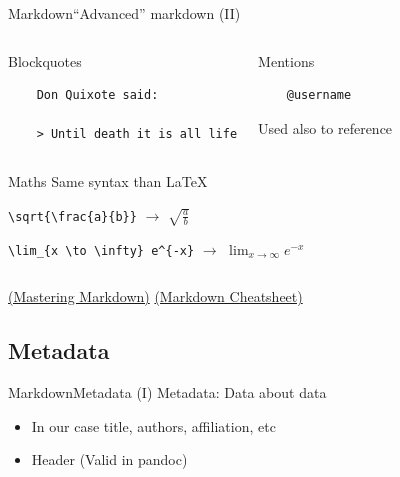 \documentclass{beamer}
\begin{document}
\begin{frame}[fragile]{Markdown}{``Advanced'' markdown (II)}
	\begin{columns}
	\begin{block}{Blockquotes}
	\begin{verbatim}
	Don Quixote said:

	> Until death it is all life
	\end{verbatim}
	\end{block}

	\begin{block}{Mentions}
	\begin{verbatim}
	@username
	\end{verbatim}
	Used also to reference
	\end{block}
	\end{columns}

	\begin{columns}
	\begin{block}{Maths}
	Same syntax than \LaTeX

	\verb|\sqrt{\frac{a}{b}}| $\rightarrow$ $\sqrt{\frac{a}{b}}$

	\verb|\lim_{x \to \infty} e^{-x}| $\rightarrow$ $\lim_{x \to \infty} e^{-x}$
	\end{block}

	\end{columns}

	\bigskip
	\href{https://guides.github.com/features/mastering-markdown/}{(Mastering Markdown)}
	\href{https://github.com/adam-p/markdown-here/wiki/Markdown-Cheatsheet}{(Markdown Cheatsheet)}
\end{frame}


\subsection{Metadata}



\begin{frame}{Markdown}{Metadata (I)}
	Metadata: Data about data
	\begin{itemize}
		\item In our case title, authors, affiliation, etc
		\item Header (Valid in pandoc)
	\end{itemize}
\footnotesize{
	\begin{exampleblock}{}
	
	\end{exampleblock}
	}
\end{frame}
\end{document}

